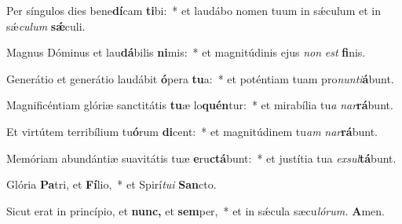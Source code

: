 \item Per síngulos dies bene\textbf{dí}cam \textbf{ti}bi:~* et laudábo nomen tuum in sǽculum et in sǽ\hspace{0.03em}\textit{culum} \textbf{sǽ}culi.
\item Magnus Dóminus et lau\textbf{dá}bilis \textbf{ni}mis:~* et magnitúdinis ejus \textit{non} \textit{est} \textbf{fi}nis.
\item Generátio et generátio laudábit \textbf{ó}pera \textbf{tu}a:~* et poténtiam tuam pro\textit{nunti}\textbf{á}bunt.
\item Magnificéntiam glóriæ sanctitátis \textbf{tu}æ lo\textbf{quén}tur:~* et mirabília tu\hspace{0.03em}\textit{a} \textit{nar}\textbf{rá}bunt.
\item Et virtútem terribílium tu\textbf{ó}rum \textbf{di}cent:~* et magnitúdinem tu\hspace{0.03em}\textit{am} \textit{nar}\textbf{rá}bunt.
\item Memóriam abundántiæ suavitátis tuæ \textbf{e}ru\textbf{ctá}bunt:~* et justítia tua \textit{exsul}\textbf{tá}bunt.
\item Glória \textbf{Pa}tri, et \textbf{Fí}lio,~* et Spirí\hspace{0.03em}\textit{tui} \textbf{San}cto.
\item Sicut erat in princípio, et \textbf{nunc,} et \textbf{sem}per,~* et in sǽcula sæcu\hspace{0.03em}\textit{lórum.} \textbf{A}men.
